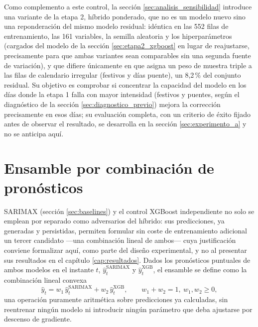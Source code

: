Como complemento a este control, la sección \ref{sec:analisis_sensibilidad} introduce
una variante de la etapa 2, híbrido ponderado, que no es un modelo nuevo sino una
reponderación del mismo modelo residual: idéntica en las 552 filas de entrenamiento, las
161 variables, la semilla aleatoria y los hiperparámetros (cargados del modelo de la
sección \ref{sec:etapa2_xgboost} en lugar de reajustarse, precisamente para que ambas
variantes sean comparables sin una segunda fuente de variación), y que difiere únicamente
en que asigna un peso de muestra triple a las filas de calendario irregular (festivos y
días puente), un 8,2\,\% del conjunto residual. Su objetivo es comprobar si concentrar la
capacidad del modelo en los días donde la etapa 1 falla con mayor intensidad (festivos y
puentes, según el diagnóstico de la sección \ref{sec:diagnostico_previo}) mejora la
corrección precisamente en esos días; su evaluación completa, con un criterio de éxito
fijado antes de observar el resultado, se desarrolla en la sección
\ref{sec:experimento_a} y no se anticipa aquí.

\section{Ensamble por combinación de pronósticos}\label{sec:metodologia_ensemble}

SARIMAX (sección \ref{sec:baselines}) y el control XGBoost independiente no solo se
emplean por separado como adversarios del híbrido: sus predicciones, ya generadas y
persistidas, permiten formular sin coste de entrenamiento adicional un tercer candidato
—una combinación lineal de ambos— cuya justificación conviene formalizar aquí, como parte
del diseño experimental, y no al presentar sus resultados en el capítulo
\ref{cap:resultados}. Dados los pronósticos puntuales de ambos modelos en el instante $t$,
$\hat y_t^{\text{SARIMAX}}$ y $\hat y_t^{\text{XGB}}$, el ensamble se define como la
combinación lineal convexa
\[
  \hat y_t = w_1\, \hat y_t^{\text{SARIMAX}} + w_2\, \hat y_t^{\text{XGB}},
  \qquad w_1 + w_2 = 1,\ w_1, w_2 \geq 0,
\]
una operación puramente aritmética sobre predicciones ya calculadas, sin reentrenar
ningún modelo ni introducir ningún parámetro que deba ajustarse por descenso de
gradiente.

